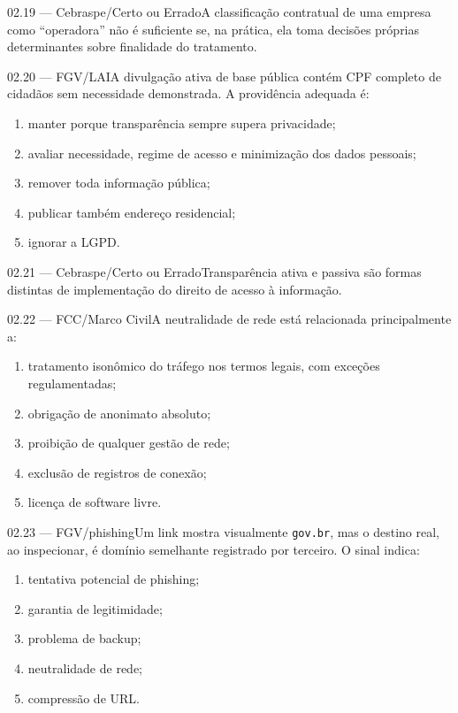 \begin{questao}{ 02.19 — Cebraspe/Certo ou Errado}A classificação contratual de uma empresa como ``operadora'' não é suficiente se, na prática, ela toma decisões próprias determinantes sobre finalidade do tratamento.\end{questao}
\begin{questao}{ 02.20 — FGV/LAI}A divulgação ativa de base pública contém CPF completo de cidadãos sem necessidade demonstrada. A providência adequada é:\begin{enumerate}[label=\Alph*)]\item manter porque transparência sempre supera privacidade;\item avaliar necessidade, regime de acesso e minimização dos dados pessoais;\item remover toda informação pública;\item publicar também endereço residencial;\item ignorar a LGPD.\end{enumerate}\end{questao}
\begin{questao}{ 02.21 — Cebraspe/Certo ou Errado}Transparência ativa e passiva são formas distintas de implementação do direito de acesso à informação.\end{questao}
\begin{questao}{ 02.22 — FCC/Marco Civil}A neutralidade de rede está relacionada principalmente a:\begin{enumerate}[label=\Alph*)]\item tratamento isonômico do tráfego nos termos legais, com exceções regulamentadas;\item obrigação de anonimato absoluto;\item proibição de qualquer gestão de rede;\item exclusão de registros de conexão;\item licença de software livre.\end{enumerate}\end{questao}
\begin{questao}{ 02.23 — FGV/phishing}Um link mostra visualmente \texttt{gov.br}, mas o destino real, ao inspecionar, é domínio semelhante registrado por terceiro. O sinal indica:\begin{enumerate}[label=\Alph*)]\item tentativa potencial de phishing;\item garantia de legitimidade;\item problema de backup;\item neutralidade de rede;\item compressão de URL.\end{enumerate}\end{questao}
